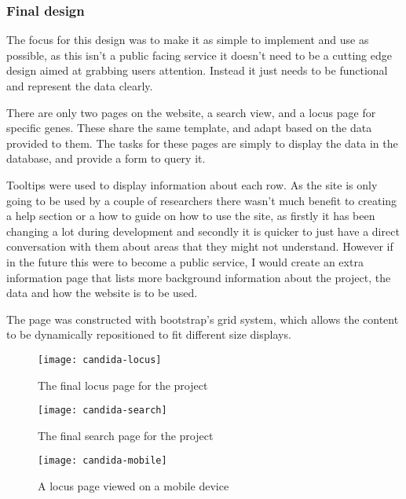 \subsubsection{Final design}
The focus for this design was to make it as simple to implement and use as possible, as this isn't a public facing service it doesn't need to be a cutting edge design aimed at grabbing users attention. Instead it just needs to be functional and represent the data clearly. 

There are only two pages on the website, a search view, and a locus page for specific genes. These share the same template, and adapt based on the data provided to them. The tasks for these pages are simply to display the data in the database, and provide a form to query it.

Tooltips were used to display information about each row. As the site is only going to be used by a couple of researchers there wasn't much benefit to creating a help section or a how to guide on how to use the site, as firstly it has been changing a lot during development and secondly it is quicker to just have a direct conversation with them about areas that they might not understand. However if in the future this were to become a public service, I would create an extra information page that lists more background information about the project, the data and how the website is to be used. 

The page was constructed with bootstrap's\cite{bootstrap} grid system, which allows the content to be dynamically repositioned to fit different size displays.

\begin{figure}[H]
\begin{center}
\texttt{[image: candida-locus]}
\caption{The final locus page for the project}
\end{center}
\end{figure}

\begin{figure}[H]
\begin{center}
\texttt{[image: candida-search]}
\caption{The final search page for the project}
\end{center}
\end{figure}

\begin{figure}[H]
\begin{center}
\texttt{[image: candida-mobile]}
\caption{A locus page viewed on a mobile device}
\end{center}
\end{figure}


